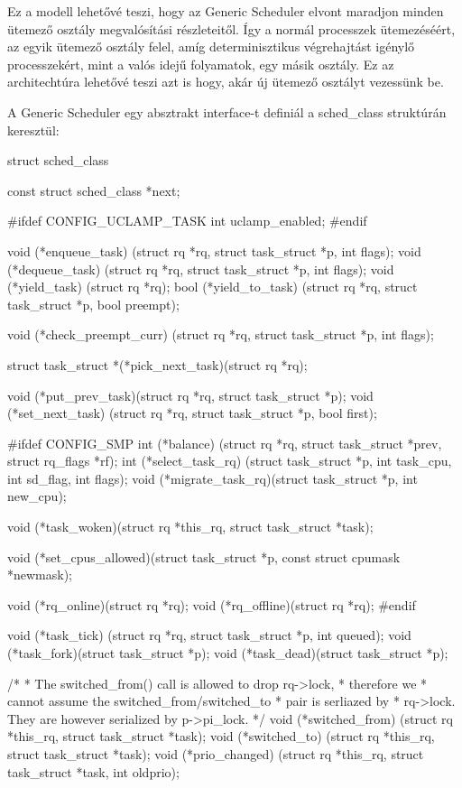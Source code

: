 Ez a modell lehetővé teszi, hogy az Generic Scheduler elvont maradjon minden ütemező osztály megvalósítási részleteitől. Így a normál processzek ütemezéséért, az egyik ütemező osztály felel, amíg determinisztikus végrehajtást igénylő processzekért, mint a valós idejű folyamatok, egy másik osztály. Ez az architechtúra lehetővé teszi azt is hogy, akár új ütemező osztályt vezessünk be.

A Generic Scheduler egy absztrakt interface-t definiál a sched\_class struktúrán keresztül:
\begin{cpp}
struct sched_class {
	const struct sched_class *next;

#ifdef CONFIG_UCLAMP_TASK
	int uclamp_enabled;
#endif

	void (*enqueue_task)
		(struct rq *rq, struct task_struct *p, int flags);
	void (*dequeue_task)
		(struct rq *rq, struct task_struct *p, int flags);
	void (*yield_task)   (struct rq *rq);
	bool (*yield_to_task)
		(struct rq *rq, struct task_struct *p, bool preempt);

	void (*check_preempt_curr)
		(struct rq *rq, struct task_struct *p, int flags);

	struct task_struct *(*pick_next_task)(struct rq *rq);

	void (*put_prev_task)(struct rq *rq, struct task_struct *p);
	void (*set_next_task)
		(struct rq *rq, struct task_struct *p, bool first);

#ifdef CONFIG_SMP
	int (*balance)
	  (struct rq *rq, struct task_struct *prev, struct rq_flags *rf);
	int  (*select_task_rq)
	  (struct task_struct *p, int task_cpu, int sd_flag, int flags);
	void (*migrate_task_rq)(struct task_struct *p, int new_cpu);

	void (*task_woken)(struct rq *this_rq, struct task_struct *task);

	void (*set_cpus_allowed)(struct task_struct *p,
				 const struct cpumask *newmask);

	void (*rq_online)(struct rq *rq);
	void (*rq_offline)(struct rq *rq);
#endif

	void (*task_tick)
		(struct rq *rq, struct task_struct *p, int queued);
	void (*task_fork)(struct task_struct *p);
	void (*task_dead)(struct task_struct *p);

	/*
	 * The switched_from() call is allowed to drop rq->lock, 
	 * therefore we
	 * cannot assume the switched_from/switched_to 
	 * pair is serliazed by
	 * rq->lock. They are however serialized by p->pi_lock.
	 */
	void (*switched_from)
		(struct rq *this_rq, struct task_struct *task);
	void (*switched_to) 
		(struct rq *this_rq, struct task_struct *task);
	void (*prio_changed)
		(struct rq *this_rq, struct task_struct *task,
			      int oldprio);

}
\end{cpp}
